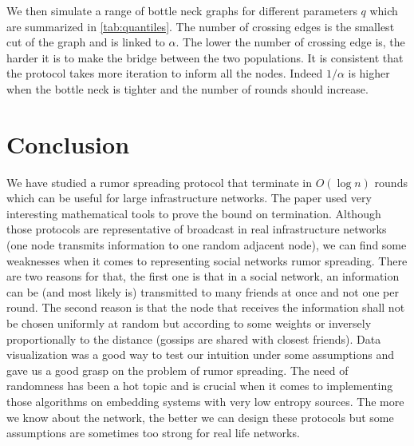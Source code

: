 \documentclass[10pt,journal,a4paper]{IEEEtran}
\begin{document}
We then simulate a range of bottle neck graphs for different parameters $q$ which are summarized in \cref{tab:quantiles}. The number of crossing edges is the smallest cut of the graph and is linked to $\alpha$. The lower the number of crossing edge is, the harder it is to make the bridge between the two populations. It is consistent that the protocol takes more iteration to inform all the nodes. Indeed $1/\alpha$ is higher when the bottle neck is tighter and the number of rounds should increase. 

\section{Conclusion}

We have studied a rumor spreading protocol that terminate in $O(\log n)$ rounds which can be useful for large infrastructure networks. The paper used very interesting mathematical tools to prove the bound on termination. Although those protocols are representative of broadcast in real infrastructure networks (one node transmits information to one random adjacent node), we can find some weaknesses when it comes to representing social networks rumor spreading. There are two reasons for that, the first one is that in a social network, an information can be (and most likely is) transmitted to many friends at once and not one per round. The second reason is that the node that receives the information shall not be chosen uniformly at random but according to some weights or inversely proportionally to the distance (gossips are shared with closest friends). Data visualization was a good way to test our intuition under some assumptions and gave us a good grasp on the problem of rumor spreading. The need of randomness has been a hot topic and is crucial when it comes to implementing those algorithms on embedding systems with very low entropy sources. The more we know about the network, the better we can design these protocols but some assumptions are sometimes too strong for real life networks. 

\end{document}
